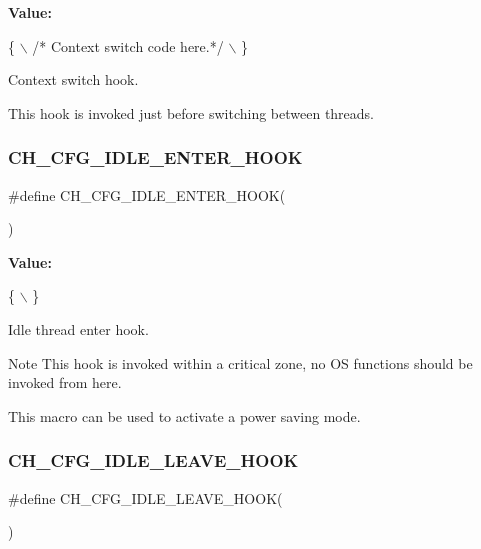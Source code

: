 {\bfseries Value\+:}
\begin{DoxyCode}
\{                              \(\backslash\)
  \textcolor{comment}{/* Context switch code here.*/}                                            \(\backslash\)
\}
\end{DoxyCode}


Context switch hook. 

This hook is invoked just before switching between threads. \hypertarget{group__config_ga5193dc6602d532b5eb171c6459d80707}{}\label{group__config_ga5193dc6602d532b5eb171c6459d80707} 
\subsubsection{\texorpdfstring{C\+H\+\_\+\+C\+F\+G\+\_\+\+I\+D\+L\+E\+\_\+\+E\+N\+T\+E\+R\+\_\+\+H\+O\+OK}{CH\_CFG\_IDLE\_ENTER\_HOOK}}
{\footnotesize\ttfamily \#define C\+H\+\_\+\+C\+F\+G\+\_\+\+I\+D\+L\+E\+\_\+\+E\+N\+T\+E\+R\+\_\+\+H\+O\+OK(\begin{DoxyParamCaption}{ }\end{DoxyParamCaption})}

{\bfseries Value\+:}
\begin{DoxyCode}
\{                                          \(\backslash\)
\}
\end{DoxyCode}


Idle thread enter hook. 

\begin{DoxyNote}{Note}
This hook is invoked within a critical zone, no OS functions should be invoked from here. 

This macro can be used to activate a power saving mode. 
\end{DoxyNote}
\hypertarget{group__config_ga2b4d6d05e655234eb7b46fb16e8180a9}{}\label{group__config_ga2b4d6d05e655234eb7b46fb16e8180a9} 
\subsubsection{\texorpdfstring{C\+H\+\_\+\+C\+F\+G\+\_\+\+I\+D\+L\+E\+\_\+\+L\+E\+A\+V\+E\+\_\+\+H\+O\+OK}{CH\_CFG\_IDLE\_LEAVE\_HOOK}}
{\footnotesize\ttfamily \#define C\+H\+\_\+\+C\+F\+G\+\_\+\+I\+D\+L\+E\+\_\+\+L\+E\+A\+V\+E\+\_\+\+H\+O\+OK(\begin{DoxyParamCaption}{ }\end{DoxyParamCaption})}

